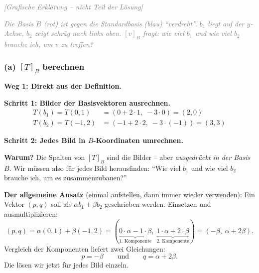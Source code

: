 \documentclass[a4paper,12pt]{article}
\newcommand{\grafik}{\textcolor{gray}{\small\textit{[Grafische Erkl\"arung -- nicht Teil der L\"osung]}}}
\begin{document}
\grafik

\begin{center}
\end{center}

\textcolor{gray}{\small\textit{Die Basis $B$ (rot) ist gegen die Standardbasis (blau) ``verdreht''. $b_1$ liegt auf der $y$-Achse, $b_2$ zeigt schr\"ag nach links oben. $[v]_B$ fragt: wie viel $b_1$ und wie viel $b_2$ brauche ich, um $v$ zu treffen?}}

\subsubsection*{(a) $[T]_B$ berechnen}

\textbf{Weg 1: Direkt aus der Definition.}

\textbf{Schritt 1: Bilder der Basisvektoren ausrechnen.}
\begin{align*}
T(b_1) = T(0, 1) &= (0 + 2\cdot 1,\; -3 \cdot 0) = (2, 0) \\
T(b_2) = T(-1, 2) &= (-1 + 2\cdot 2,\; -3 \cdot (-1)) = (3, 3)
\end{align*}

\textbf{Schritt 2: Jedes Bild in $B$-Koordinaten umrechnen.}

\textbf{Warum?} Die Spalten von $[T]_B$ sind die Bilder -- aber \emph{ausgedr\"uckt in der Basis $B$}. Wir m\"ussen also f\"ur jedes Bild herausfinden: ``Wie viel $b_1$ und wie viel $b_2$ brauche ich, um es zusammenzubauen?''

\textbf{Der allgemeine Ansatz} (einmal aufstellen, dann immer wieder verwenden): Ein Vektor $(p, q)$ soll als $\alpha b_1 + \beta b_2$ geschrieben werden. Einsetzen und ausmultiplizieren:
\[
(p, q) = \alpha (0,1) + \beta (-1, 2)
= (\underbrace{0\cdot\alpha - 1\cdot\beta}_{\text{1.\ Komponente}},\; \underbrace{1\cdot\alpha + 2\cdot\beta}_{\text{2.\ Komponente}})
= (-\beta,\; \alpha + 2\beta).
\]
Vergleich der Komponenten liefert zwei Gleichungen:
\[
p = -\beta \qquad\text{und}\qquad q = \alpha + 2\beta.
\]
Die l\"osen wir jetzt f\"ur jedes Bild einzeln.
\end{document}
